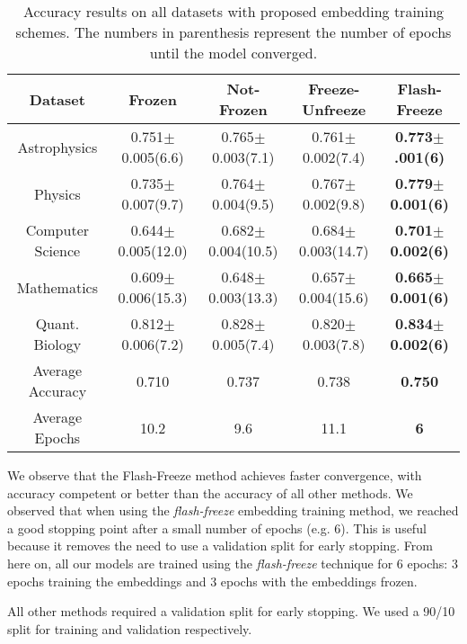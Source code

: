 \begin{center}\begin{table}[H]\begin{tabular}{||c c c c c ||}
 \hline
 Dataset & Frozen           & Not-Frozen & Freeze-Unfreeze & Flash-Freeze\\ [0.5ex]
 \hline\hline
Astrophysics       & 0.751$\pm$0.005(6.6)         & 0.765$\pm$0.003(7.1)  & 0.761$\pm$0.002(7.4)  & \textbf{0.773$\pm$.001(6)}\\
Physics            & 0.735$\pm$0.007(9.7)         & 0.764$\pm$0.004(9.5)  & 0.767$\pm$0.002(9.8)  & \textbf{0.779$\pm$0.001(6)}\\
Computer Science   & 0.644$\pm$0.005(12.0)        & 0.682$\pm$0.004(10.5) & 0.684$\pm$0.003(14.7) & \textbf{0.701$\pm$0.002(6)}\\
Mathematics        & 0.609$\pm$0.006(15.3)        & 0.648$\pm$0.003(13.3) & 0.657$\pm$0.004(15.6) & \textbf{0.665$\pm$0.001(6)}\\
Quant. Biology     & 0.812$\pm$0.006(7.2)         & 0.828$\pm$0.005(7.4)  & 0.820$\pm$0.003(7.8)  & \textbf{0.834$\pm$0.002(6)}\\
Average Accuracy   & 0.710                        & 0.737                 & 0.738                 & \textbf{0.750}\\
Average Epochs     & 10.2                         & 9.6                   & 11.1                  & \textbf{6}\\
 [1ex]\hline\end{tabular}\caption{Accuracy results on all datasets with proposed embedding training schemes.
 The numbers in parenthesis represent the number of epochs until the model converged.}
\end{table}\end{center}

We observe that the Flash-Freeze method achieves faster convergence, with accuracy competent or better than
the accuracy of all other methods. We observed that when using the \textit{flash-freeze} embedding training method, we reached a
good stopping point after a small number of epochs (e.g. 6). This is useful because it removes the need to use a validation split for early
stopping. From here on, all our models are trained using the \textit{flash-freeze} technique for 6 epochs: 3 epochs training the embeddings and 3 epochs
with the embeddings frozen.

All other methods required a validation split for early stopping. We used a 90/10 split for training and validation respectively.

